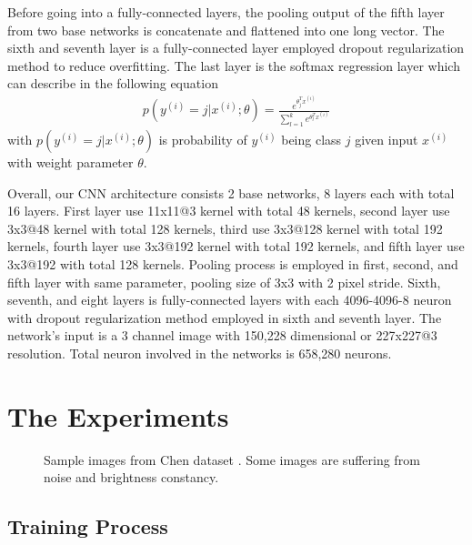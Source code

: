 \documentclass[conference]{IEEEtran}
\begin{document}
Before going into a fully-connected layers, the pooling output of the fifth layer from two base networks is concatenate and flattened into one long vector. The sixth and seventh layer is a fully-connected layer employed dropout regularization method to reduce overfitting. The last layer is the softmax regression layer which can describe in the following equation
\begin{align}
	p(y^{(i)}=j|x^{(i)};\theta)=\frac{e^{\theta^T_jx^{(i)}}}{\sum_{l=1}^ke^{\theta^T_lx^{(i)}}}	
\end{align}
with $p(y^{(i)}=j|x^{(i)};\theta)$ is probability of $y^{(i)}$ being class $j$ given input $x^{(i)}$ with weight parameter $\theta$. 

Overall, our CNN architecture consists 2 base networks, 8 layers each with total 16 layers. First layer use 11x11@3 kernel with total 48 kernels, second layer use 3x3@48 kernel with total 128 kernels, third use 3x3@128 kernel with total 192 kernels, fourth layer use 3x3@192 kernel with total 192 kernels, and fifth layer use 3x3@192 with total 128 kernels. Pooling process is employed in first, second, and fifth layer with same parameter, pooling size of 3x3 with 2 pixel stride. Sixth, seventh, and eight layers is fully-connected layers with each 4096-4096-8 neuron with dropout regularization method employed in sixth and seventh layer. The network's input is a 3 channel image with 150,228 dimensional or 227x227@3 resolution. Total neuron involved in the networks is 658,280 neurons. 

\section{The Experiments}

\begin{figure}
\centering
{}
\caption{Sample images from Chen dataset \cite{pchen}. Some images are suffering from noise and brightness constancy.}
\label{fig:sample_dataset}
\end{figure}

\subsection{Training Process}
\end{document}
